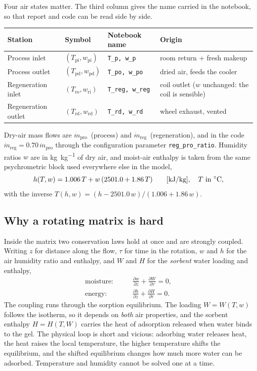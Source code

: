 \documentclass[11pt]{article}
\newcommand{\mdp}{\ensuremath{\dot m_{\mathrm{pro}}}}
\newcommand{\mdr}{\ensuremath{\dot m_{\mathrm{reg}}}}
\newcommand{\degC}{\ensuremath{^{\circ}\mathrm{C}}}
\begin{document}
Four air states matter. The third column gives the name carried in the
notebook, so that report and code can be read side by side.

\begin{center}
\begin{tabular}{@{}llll@{}}
\toprule
Station & Symbol & Notebook name & Origin \\
\midrule
Process inlet      & $(T_{\mathrm{pi}},w_{\mathrm{pi}})$ & \texttt{T\_p, w\_p}     & room return + fresh makeup \\
Process outlet     & $(T_{\mathrm{pd}},w_{\mathrm{pd}})$ & \texttt{T\_po, w\_po}   & dried air, feeds the cooler \\
Regeneration inlet & $(T_{\mathrm{ro}},w_{\mathrm{ri}})$ & \texttt{T\_reg, w\_reg} & coil outlet ($w$ unchanged: the coil is sensible) \\
Regeneration outlet& $(T_{\mathrm{rd}},w_{\mathrm{rd}})$ & \texttt{T\_rd, w\_rd}   & wheel exhaust, vented \\
\bottomrule
\end{tabular}
\end{center}

Dry-air mass flows are \mdp\ (process) and \mdr\ (regeneration), and in the
code $\mdr = 0.70\,\mdp$ through the configuration parameter
\texttt{reg\_pro\_ratio}. Humidity ratios $w$ are in
\si{\kilogram\per\kilogram} of dry air, and moist-air enthalpy is taken from
the same psychrometric block used everywhere else in the model,
\begin{equation}
h(T,w) = 1.006\,T + w\,(2501.0 + 1.86\,T)
\qquad [\si{\kilo\joule\per\kilogram}],\quad T\ \text{in \degC},
\label{eq:dw:enthalpy}
\end{equation}
with the inverse $T(h,w) = (h - 2501.0\,w)/(1.006 + 1.86\,w)$.

\subsection{Why a rotating matrix is hard}
\label{sec:dw:hard}

Inside the matrix two conservation laws hold at once and are strongly
coupled. Writing $z$ for distance along the flow, $\tau$ for time in the
rotation, $w$ and $h$ for the air humidity ratio and enthalpy, and $W$ and
$H$ for the \emph{sorbent} water loading and enthalpy,
\begin{align}
\text{moisture:}&\qquad
\frac{\partial w}{\partial z}+\frac{\partial W}{\partial \tau}=0,
\label{eq:dw:moisture_pde}\\
\text{energy:}&\qquad
\frac{\partial h}{\partial z}+\frac{\partial H}{\partial \tau}=0 .
\label{eq:dw:energy_pde}
\end{align}
The coupling runs through the sorption equilibrium. The loading $W=W(T,w)$
follows the isotherm, so it depends on \emph{both} air properties, and the
sorbent enthalpy $H=H(T,W)$ carries the heat of adsorption released when
water binds to the gel. The physical loop is short and vicious: adsorbing
water releases heat, the heat raises the local temperature, the higher
temperature shifts the equilibrium, and the shifted equilibrium changes how
much more water can be adsorbed. Temperature and humidity cannot be solved
one at a time.
\end{document}
